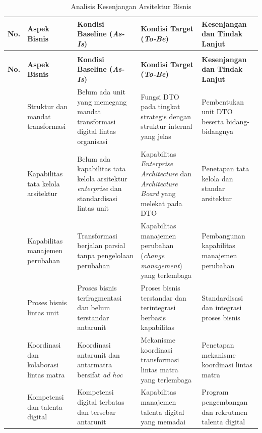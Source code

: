 {\small
\begin{longtable}{@{}>{\raggedright\arraybackslash}p{}>{\raggedright\arraybackslash}p{}>{\raggedright\arraybackslash}p{}>{\raggedright\arraybackslash}p{}>{\raggedright\arraybackslash}p{}@{}}
\caption{Analisis Kesenjangan Arsitektur Bisnis}
\label{tab:d4-11}\\
\toprule
\textbf{No.} & \textbf{Aspek Bisnis} & \textbf{Kondisi Baseline (}\textbf{\textit{As-Is}}\textbf{)} & \textbf{Kondisi Target (}\textbf{\textit{To-Be}}\textbf{)} & \textbf{Kesenjangan dan Tindak Lanjut}\\
\midrule
\endfirsthead
\multicolumn{5}{@{}l}{\small\itshape \tablename\ \thetable{} (lanjutan)}\\
\toprule
\textbf{No.} & \textbf{Aspek Bisnis} & \textbf{Kondisi Baseline (}\textbf{\textit{As-Is}}\textbf{)} & \textbf{Kondisi Target (}\textbf{\textit{To-Be}}\textbf{)} & \textbf{Kesenjangan dan Tindak Lanjut}\\
\midrule
\endhead
\bottomrule
\endlastfoot
1 & Struktur dan mandat transformasi & Belum ada unit yang memegang mandat transformasi digital lintas organisasi & Fungsi DTO pada tingkat strategis dengan struktur internal yang jelas & Pembentukan unit DTO beserta bidang-bidangnya\\
2 & Kapabilitas tata kelola arsitektur & Belum ada kapabilitas tata kelola arsitektur \textit{enterprise} dan standardisasi lintas unit & Kapabilitas \textit{Enterprise Architecture} dan \textit{Architecture Board} yang melekat pada DTO & Penetapan tata kelola dan standar arsitektur\\
3 & Kapabilitas manajemen perubahan & Transformasi berjalan parsial tanpa pengelolaan perubahan & Kapabilitas manajemen perubahan (\textit{change management}) yang terlembaga & Pembangunan kapabilitas manajemen perubahan\\
4 & Proses bisnis lintas unit & Proses bisnis terfragmentasi dan belum terstandar antarunit & Proses bisnis terstandar dan terintegrasi berbasis kapabilitas & Standardisasi dan integrasi proses bisnis\\
5 & Koordinasi dan kolaborasi lintas matra & Koordinasi antarunit dan antarmatra bersifat \textit{ad hoc} & Mekanisme koordinasi transformasi lintas matra yang terlembaga & Penetapan mekanisme koordinasi lintas matra\\
6 & Kompetensi dan talenta digital & Kompetensi digital terbatas dan tersebar antarunit & Kapabilitas manajemen talenta digital yang memadai & Program pengembangan dan rekrutmen talenta digital\\
\end{longtable}
}

